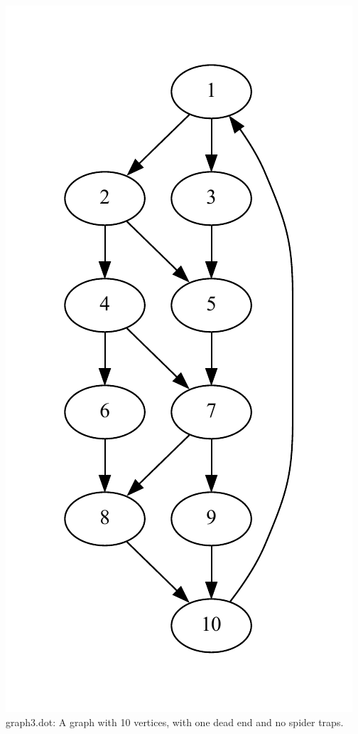 \documentclass[9pt,twoside]{exam}
\begin{document}
\begin{center}
\includegraphics[scale=0.5]{graph2.pdf} \\
graph3.dot: A graph with 10 vertices, with one dead end and no spider traps. \\

\end{center}
\end{document}

